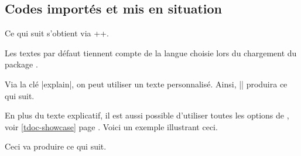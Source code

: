 \documentclass[10pt, a4paper]{article}
\begin{document}
\subsection{Codes importés et mis en situation} \label{tdoc-latexshow}

\begin{tdocexa}
    Ce qui suit s'obtient via \tdocinlatex++.

    \medskip

    \begin{tdoc-doc-showcase}
    \end{tdoc-doc-showcase}
\end{tdocexa}


\begin{tdocnote}
    Les textes par défaut tiennent compte de la langue choisie lors du chargement du package \thispack{}.
\end{tdocnote}




\begin{tdocexa}
    Via la clé \tdocinlatex|explain|, on peut utiliser un texte personnalisé. Ainsi, \tdocinlatex|| produira ce qui suit.

    \medskip

    \begin{tdoc-doc-showcase}
    \end{tdoc-doc-showcase}
\end{tdocexa}




\begin{tdocexa}
    En plus du texte explicatif, il est aussi possible d'utiliser toutes les options de , voir \ref{tdoc-showcase} page \pageref{tdoc-showcase}.
    Voici un exemple illustrant ceci.

    \medskip


    \medskip

    Ceci va produire ce qui suit.

    \medskip

    \begin{tdoc-doc-showcase}
        
    \end{tdoc-doc-showcase}
\end{tdocexa}
\end{document}
